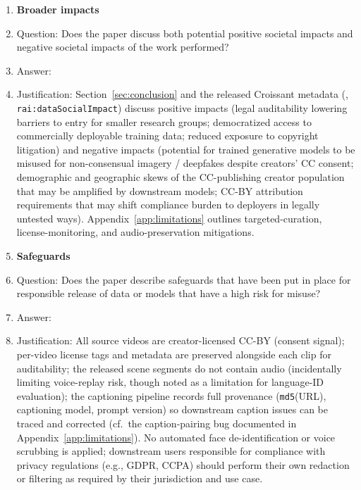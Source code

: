 \begin{enumerate}
\item {\bf Broader impacts}
    \item[] Question: Does the paper discuss both potential positive societal impacts and negative societal impacts of the work performed?
    \item[] Answer: \answerYes{}
    \item[] Justification: Section~\ref{sec:conclusion} and the released Croissant metadata (, \texttt{rai:dataSocialImpact}) discuss positive impacts (legal auditability lowering barriers to entry for smaller research groups; democratized access to commercially deployable training data; reduced exposure to copyright litigation) and negative impacts (potential for trained generative models to be misused for non-consensual imagery / deepfakes despite creators' CC consent; demographic and geographic skews of the CC-publishing creator population that may be amplified by downstream models; CC-BY attribution requirements that may shift compliance burden to deployers in legally untested ways). Appendix~\ref{app:limitations} outlines targeted-curation, license-monitoring, and audio-preservation mitigations.

\item {\bf Safeguards}
    \item[] Question: Does the paper describe safeguards that have been put in place for responsible release of data or models that have a high risk for misuse?
    \item[] Answer: \answerYes{}
    \item[] Justification: All source videos are creator-licensed CC-BY (consent signal); per-video license tags and metadata are preserved alongside each clip for auditability; the released scene segments do not contain audio (incidentally limiting voice-replay risk, though noted as a limitation for language-ID evaluation); the captioning pipeline records full provenance (\texttt{md5}(URL), captioning model, prompt version) so downstream caption issues can be traced and corrected (cf.\ the caption-pairing bug documented in Appendix~\ref{app:limitations}). No automated face de-identification or voice scrubbing is applied; downstream users responsible for compliance with privacy regulations (e.g., GDPR, CCPA) should perform their own redaction or filtering as required by their jurisdiction and use case.


\end{enumerate}
